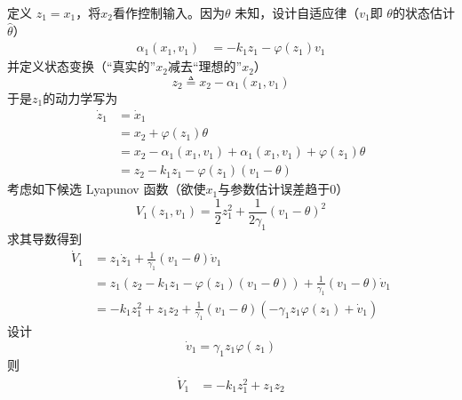 定义 $z_1 = x_1$，将$x_2$看作控制输入。因为$\theta$ 未知，设计自适应律（$v_1$即 $\theta$的状态估计$\hat{\theta}$）
\begin{align*}
  \alpha_1 (x_1, v_1) & = - k_1 z_1 - \varphi (z_1) v_1
\end{align*}
并定义状态变换（“真实的”$x_2$减去“理想的”$x_2$）
\[ z_2 \triangleq x_2 - \alpha_1 (x_1, v_1) \]
于是$z_1$的动力学写为
\begin{align*}
  \dot{z}_1 & = \dot{x}_1\\
  & = x_2 + \varphi (z_1) \theta\\
  & = x_2 - \alpha_1 (x_1, v_1) + \alpha_1 (x_1, v_1) + \varphi (z_1)
  \theta\\
  & = z_2 - k_1 z_1 - \varphi (z_1) (v_1 - \theta)
\end{align*}
考虑如下候选 Lyapunov 函数（欲使$x_1$与参数估计误差趋于$0$）
\[ V_1 (z_1, v_1) = \frac{1}{2} z^2_1 + \frac{1}{2 \gamma_1} (v_1 - \theta)^2
\]
求其导数得到
\begin{align*}
  \dot{V}_1 & = z_1 \dot{z}_1 + \frac{1}{\gamma_1} (v_1 - \theta)
  \dot{v}_1\\
  & = z_1 (z_2 - k_1 z_1 - \varphi (z_1) (v_1 - \theta)) +
  \frac{1}{\gamma_1} (v_1 - \theta) \dot{v}_1\\
  & = -k_1z_1^2+z_1z_2+\frac{1}{\gamma_1} (v_1-\theta)(-\gamma_1z_1\varphi (z_1) +\dot{v}_1)
\end{align*}
设计
\[\dot{v}_1 = \gamma_1 z_1 \varphi (z_1)\]
则
\begin{align*}
  \dot{V}_1 &  = - k_1 z^2_1 + z_1 z_2
\end{align*}


